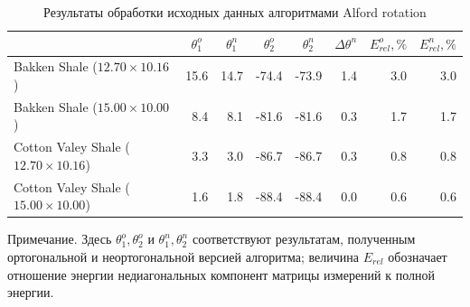 \documentclass[a4paper,11pt]{article}
\begin{document}
\begin{table}[h]
	\footnotesize
	\caption{Результаты обработки исходных данных алгоритмами Alford rotation}
	\renewcommand{\arraystretch}{1.5}
	\begin{tabularx}{\textwidth}{|X|rr|rr|r|rr|}
		\hline	
		&\multicolumn{1}{c}{$\theta_1^o$} & \multicolumn{1}{c|}{$\theta_1^n$} & \multicolumn{1}{c}{$\theta_2^o$} & \multicolumn{1}{c|}{$\theta_2^n$} & \multicolumn{1}{c|}{$\Delta\theta^n$}& \multicolumn{1}{c}{$E_{rel}^o, \%$} & \multicolumn{1}{c|}{$E_{rel}^n, \%$} \\ \hline
		\hline Bakken Shale ($12.70 \times 10.16$) & 15.6 & 14.7 & -74.4 & -73.9  & 1.4  & 3.0 & 3.0 \\
		\hline Bakken Shale ($15.00 \times 10.00$) & 8.4 & 8.1 & -81.6 & -81.6 & 0.3 & 1.7 & 1.7 \\
		\hline Cotton Valey Shale ($12.70 \times 10.16$) & 3.3 & 3.0 & -86.7 & -86.7  & 0.3 & 0.8 & 0.8 \\ 
		\hline Cotton Valey Shale ($15.00 \times 10.00$) & 1.6 & 1.8 & -88.4 & -88.4  & 0.0  & 0.6 & 0.6 \\	   
		\hline
	\end{tabularx} 
	\begin{flushleft}
		Примечание. Здесь $\theta_1^o,\theta_2^o$ и $\theta_1^n,\theta_2^n$ соответствуют результатам, полученным ортогональной и неортогональной версией алгоритма; величина $E_{rel}$ обозначает отношение энергии недиагональных компонент матрицы измерений к полной энергии. 
	\end{flushleft}
	\label{tab:std_process_results}
	\renewcommand{\arraystretch}{1.0}
\end{table}
\end{document}
